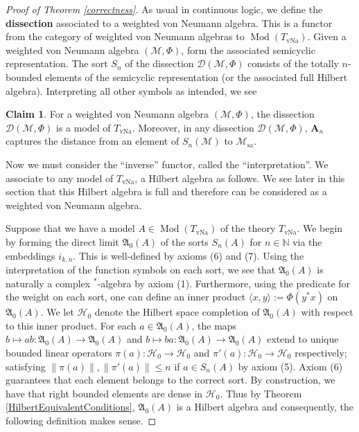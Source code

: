 \documentclass[12pt]{amsart}
\theoremstyle{definition}
\newtheorem{claim}[thm]{Claim}
\def\cal{\mathcal}
\def \Md{\operatorname{Mod}}
\DeclareMathOperator{\vNa}{vNa}
\def \sa{\operatorname{sa}}
\def \vA{\mathbf{A}}
\def \bbN{\mathbb{N}}
\begin{document}
\begin{proof}[Proof of Theorem \ref{correctness}]

    As usual in continuous logic, we define the \textbf{dissection} associated to a weighted von Neumann algebra.  This is a functor from the category of weighted von Neumann algebras to $\Md(T_{\vNa})$.  Given a weighted von Neumann algebra $(\cal M, \Phi)$, form the associated semicyclic representation.  The sort $S_n$ of the dissection $\cal D(\cal M, \Phi)$ consists of the totally $n$-bounded elements of the semicyclic representation (or the associated full Hilbert algebra).  Interpreting all other symbols as intended, we see

    \begin{claim}
        For a weighted von Neumann algebra $(\cal M,\Phi)$, the dissection $\cal D(\cal M,\Phi)$ is a model of $T_{\vNa}$.  Moreover, in any dissection $\cal D(\cal M,\Phi)$, $\vA_n$ captures the distance from an element of $S_n(\cal M)$ to $\cal M_{\sa}$.
    \end{claim}

    Now we must consider the ``inverse'' functor, called the ``interpretation''.  We associate to any model of $T_{\vNa}$, a Hilbert algebra as follows.  We see later in this section that this Hilbert algebra is full and therefore can be considered as a weighted von Neumann algebra.

    Suppose that we have a model $A \in \Md(T_{\vNa})$ of the theory $T_{\vNa}$.  We begin by forming the direct limit $\mathfrak{A}_0(A)$ of the sorts $S_n(A)$ for $n \in \bbN$ via the embeddings $i_{k,n}$.  This is well-defined by axioms (6) and (7).  Using the interpretation of the function symbols on each sort, we see that $\mathfrak{A}_0(A)$ is naturally a complex $^*$-algebra by axiom (1).  Furthermore, using the predicate for the weight on each sort, one can define an inner product $\langle x,y \rangle := \Phi(y^*x)$ on $\mathfrak{A}_0(A)$.  We let $\cal H_0$ denote the Hilbert space completion of $\mathfrak{A}_0(A)$ with respect to this inner product.  For each $a \in \mathfrak{A}_0(A)$, the maps $b \mapsto ab: \mathfrak{A}_0(A) \to \mathfrak{A}_0(A)$ and $b \mapsto ba: \mathfrak{A}_0(A) \to \mathfrak{A}_0(A)$ extend to unique bounded linear operators $\pi(a): \cal H_0 \to \cal H_0$ and $\pi'(a): \cal H_0 \to \cal H_0$ respectively; satisfying $\|\pi(a)\|, \|\pi'(a)\| \leq n$ if $a \in S_n(A)$ by axiom (5).  Axiom (6) guarantees that each element belongs to the correct sort.  By construction, we have that right bounded elements are dense in $\cal H_0$.  Thus by Theorem \ref{HilbertEquivalentConditions}, $\mathfrak{A}_0(A)$ is a Hilbert algebra and consequently, the following definition makes sense.


\end{proof}
\end{document}
